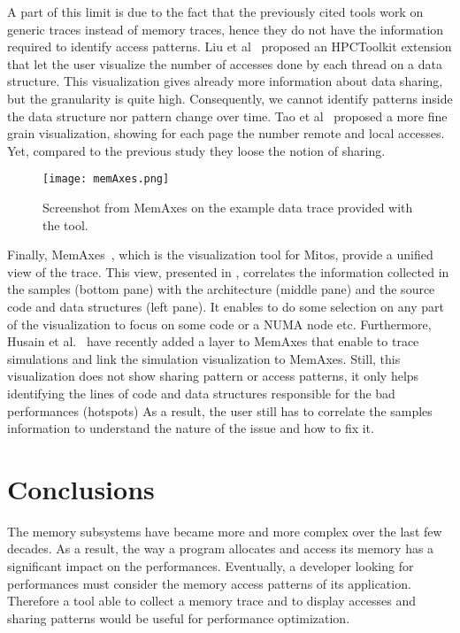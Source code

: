 A part of this limit is due to the fact that the previously cited tools work on generic traces instead of memory traces, hence they do not have the information required to identify access patterns.
Liu et al~\cite{Liu13Datacentric,Liu14Tool} proposed an \gls{HPCToolkit} extension that let the user visualize the number of accesses done by each thread on a data structure.
This visualization gives already more information about data sharing, but the granularity is quite high.
Consequently, we cannot identify patterns inside the data structure nor pattern change over time.
Tao et al~\cite{Tao01Visualizing} proposed a more fine grain  visualization, showing for each page the number remote and local accesses.
Yet, compared to the previous study they loose the notion of sharing.

\begin{figure}[htb]
    \centering
    \texttt{[image: memAxes.png]}
    \caption[Screenshot from MemAxes.]{Screenshot from MemAxes on the example data trace provided with the
    tool.}
    \label{fig:memaxes}
\end{figure}

Finally, \gls{MemAxes}~\cite{Gimenez14Dissecting}, which is the visualization tool for \gls{Mitos}, provide a unified view of the trace.
This view, presented in , correlates the information collected in the samples (bottom pane) with the architecture (middle pane) and the source code and data structures (left pane).
It enables to do some selection on any part of the visualization to focus on some code or a NUMA node etc.
Furthermore, Husain et al.~\cite{Husain15Relating} have recently added a layer to \gls{MemAxes} that enable to trace simulations and link the simulation visualization to \gls{MemAxes}.
Still, this visualization does not show sharing pattern or access patterns, it only helps identifying the lines of code and data structures responsible for the bad performances (hotspots)
As a result, the user still has to correlate the samples information to understand the nature of the issue and how to fix it.

\section{Conclusions}
\label{sec:mem-cncl}

The memory subsystems have became more and more complex over the last few decades.
As a result, the way a program allocates and access its memory has a significant impact on the performances.
Eventually, a developer looking for performances must consider the memory access patterns of its application.
Therefore a tool able to collect a memory trace and to display accesses and sharing patterns would be useful for performance optimization.

